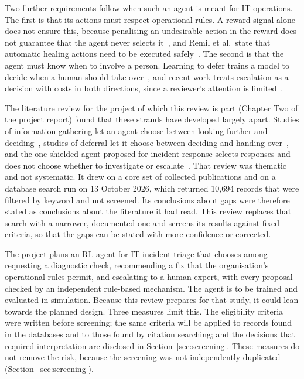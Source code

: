 \documentclass[journal]{IEEEtran}
\begin{document}
Two further requirements follow when such an agent is meant for IT operations. The first is that its actions must respect operational rules. A reward signal alone does not ensure this, because penalising an undesirable action in the reward does not guarantee that the agent never selects it~\cite{konighofer2025}, and Remil et al.\ state that automatic healing actions need to be executed safely~\cite{remil2024}. The second is that the agent must know when to involve a person. Learning to defer trains a model to decide when a human should take over~\cite{madras2018}, and recent work treats escalation as a decision with costs in both directions, since a reviewer's attention is limited~\cite{turan2026}.

The literature review for the project of which this review is part (Chapter Two of the project report) found that these strands have developed largely apart. Studies of information gathering let an agent choose between looking further and deciding~\cite{janisch2019,kim2025}, studies of deferral let it choose between deciding and handing over~\cite{madras2018,joshi2023}, and the one shielded agent proposed for incident response selects responses and does not choose whether to investigate or escalate~\cite{alauthman2026}. That review was thematic and not systematic. It drew on a core set of collected publications and on a database search run on 13 October 2026, which returned 10,694 records that were filtered by keyword and not screened. Its conclusions about gaps were therefore stated as conclusions about the literature it had read. This review replaces that search with a narrower, documented one and screens its results against fixed criteria, so that the gaps can be stated with more confidence or corrected.

The project plans an RL agent for IT incident triage that chooses among requesting a diagnostic check, recommending a fix that the organisation's operational rules permit, and escalating to a human expert, with every proposal checked by an independent rule-based mechanism. The agent is to be trained and evaluated in simulation. Because this review prepares for that study, it could lean towards the planned design. Three measures limit this. The eligibility criteria were written before screening; the same criteria will be applied to records found in the databases and to those found by citation searching; and the decisions that required interpretation are disclosed in Section~\ref{sec:screening}. These measures do not remove the risk, because the screening was not independently duplicated (Section~\ref{sec:screening}).
\end{document}
